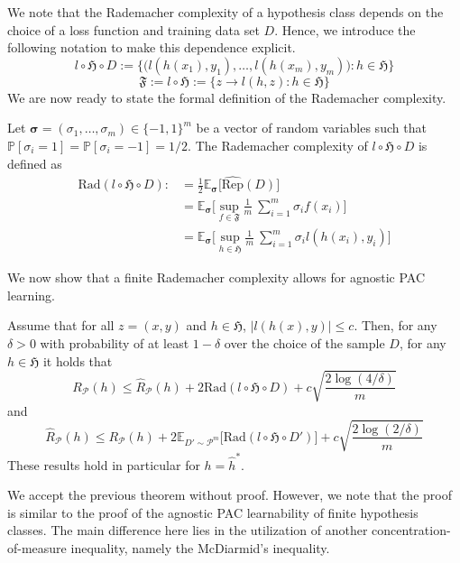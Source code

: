We note that the Rademacher complexity of a hypothesis class depends on the
choice of a loss function and training data set $D$. Hence, we introduce the
following notation to make this dependence explicit.
$$l \circ \mathfrak{H} \circ D := \{\bigl(l(h(x_1), y_1), \dots, l(h(x_m), y_m)\bigr) : h \in
\mathfrak{H}\}$$
$$
\mathfrak{F} := l \circ \mathfrak{H} := \{ z \to l(h,z): h \in \mathfrak{H}\}
$$
We are now ready to state the formal definition of the Rademacher complexity.
\begin{definition}
Let $\mathbf{\sigma} = (\sigma_1, \dots, \sigma_m) \in \{-1,1\}^m$ be a vector
of random variables such that $\mathbb{P} [\sigma_i = 1] = \mathbb{P} [\sigma_i=-1]
= 1/2$. The Rademacher complexity of $l\circ \mathfrak{H} \circ D$ is defined as
\begin{align*}
\text{Rad}(l \circ \mathfrak{H} \circ D) :&= \frac{1}{2} \mathbb{E}_{\mathbf{\sigma}} \bigl[ \hat{\text{Rep}}(D) \bigr] \\
&=\mathbb{E}_{\mathbf{\sigma}} \bigl[ \sup_{f \in \mathfrak{F}} \frac{1}{m} \ \sum_{i=1}^{m} \sigma_i f(x_i) \bigr] \\
&= \mathbb{E}_{\mathbf{\sigma}} \bigl[ \sup_{h \in \mathfrak{H}} \frac{1}{m} \ \sum_{i=1}^{m} \sigma_i l(h(x_i), y_i) \bigr]
\end{align*} 
\end{definition}
We now show that a finite Rademacher complexity allows for agnostic PAC learning.
\begin{thm}
	Assume that for all $z=(x,y)$ and $h \in \mathfrak{H}$, $|l(h(x),y)| \leq c$.
	Then, for any $\delta > 0$ with probability of at least $1-\delta$ over
	the choice of the sample $D$, for any $h \in \mathfrak{H}$ it holds that
	\begin{equation}
		\label{eq:ERM_principle}
		R_{\mathcal{P}}(h) \leq \hat{R}_{\mathcal{P}}(h) + 2 \text{Rad}(l \circ \mathfrak{H} \circ D) + c \sqrt{\frac{2 \log(4/\delta)}{m}}		
	\end{equation}
	and 
	$$
	\hat{R}_{\mathcal{P}}(h) \leq R_{\mathcal{P}}(h) + 2 \mathbb{E}_{D' \sim \mathcal{P}^m} \bigl[ \text{Rad}(l \circ \mathfrak{H} \circ D') \bigr] + c \sqrt{\frac{2 \log(2/\delta)}{m}}
	$$
	These results hold in particular for $h=\hat{h}^*$.
\end{thm}
We accept the previous theorem without proof. However, we note that the proof is
similar to the proof of the agnostic PAC learnability of finite hypothesis
classes. The main difference here lies in the utilization of another
concentration-of-measure inequality, namely the McDiarmid's inequality.
